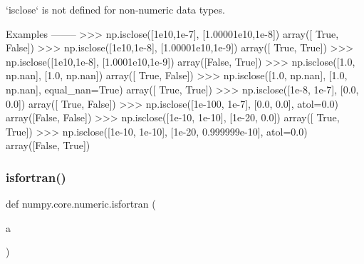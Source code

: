 \begin{DoxyVerb}
`isclose` is not defined for non-numeric data types.

Examples
--------
>>> np.isclose([1e10,1e-7], [1.00001e10,1e-8])
array([ True, False])
>>> np.isclose([1e10,1e-8], [1.00001e10,1e-9])
array([ True, True])
>>> np.isclose([1e10,1e-8], [1.0001e10,1e-9])
array([False,  True])
>>> np.isclose([1.0, np.nan], [1.0, np.nan])
array([ True, False])
>>> np.isclose([1.0, np.nan], [1.0, np.nan], equal_nan=True)
array([ True, True])
>>> np.isclose([1e-8, 1e-7], [0.0, 0.0])
array([ True, False])
>>> np.isclose([1e-100, 1e-7], [0.0, 0.0], atol=0.0)
array([False, False])
>>> np.isclose([1e-10, 1e-10], [1e-20, 0.0])
array([ True,  True])
>>> np.isclose([1e-10, 1e-10], [1e-20, 0.999999e-10], atol=0.0)
array([False,  True])
\end{DoxyVerb}
 \mbox{\label{namespacenumpy_1_1core_1_1numeric_aca2519ee360f263c4f3410065dd08692}} 
\subsubsection{\texorpdfstring{isfortran()}{isfortran()}}
{\footnotesize\ttfamily def numpy.\+core.\+numeric.\+isfortran (\begin{DoxyParamCaption}\item[{}]{a }\end{DoxyParamCaption})}

